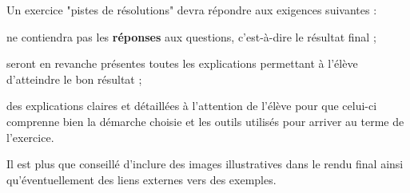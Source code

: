 Un exercice "pistes de résolutions" devra répondre aux exigences suivantes :
\item ne contiendra pas les \textbf{réponses} aux questions, c'est-à-dire le résultat final ;
\item seront en revanche présentes toutes les explications permettant à l'élève d'atteindre le bon résultat ;
\item des explications claires et détaillées à l'attention de l'élève pour que celui-ci comprenne bien la démarche choisie et les outils utilisés pour arriver au terme de l'exercice.

Il est plus que conseillé d'inclure des images illustratives dans le rendu final ainsi qu'éventuellement des liens externes vers des exemples.
